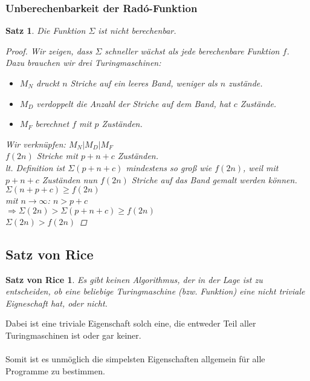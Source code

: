 \documentclass{article}
\begin{document}
\subsubsection{Unberechenbarkeit der Rad\'o-Funktion}
\begin{framed}
    \newtheorem*{rado}{Satz}
    \begin{rado}
        Die Funktion $\Sigma$ ist nicht berechenbar.

        \begin{proof}
            Wir zeigen, dass $\Sigma$ schneller wächst als jede berechenbare Funktion $f$.\\
            Dazu brauchen wir drei Turingmaschinen:
            \begin{itemize}
                \item $M_N$ druckt $n$ Striche auf ein leeres Band, weniger als $n$ zustände.
                \item $M_D$ verdoppelt die Anzahl der Striche auf dem Band, hat $c$ Zustände.
                \item $M_F$ berechnet $f$ mit $p$ Zuständen.
            \end{itemize}
            Wir verknüpfen: $M_N | M_D | M_F$ \\
            \Rightarrow $f(2n)$ Striche mit $p+n+c$ Zuständen.\\
            lt. Definition ist $\Sigma(p+n+c)$ mindestens so groß wie $f(2n)$, weil mit $p+n+c$ Zuständen nun $f(2n)$ Striche auf das Band gemalt werden können.\\
            \Rightarrow $\Sigma(n+p+c) \geq f(2n)$\\
            mit $n\rightarrow\infty$: $n>p+c$\\$\Rightarrow\Sigma(2n) > \Sigma(p+n+c)\geq f(2n)$\\
                \Rightarrow $\Sigma(2n)>f(2n)$\qedhere
        \end{proof}
    \end{rado}
\end{framed}
\subsection{Satz von Rice}
\newtheorem*{rice}{Satz von Rice}
\begin{framed}
    \begin{rice}
        Es gibt keinen Algorithmus, der in der Lage ist zu entscheiden, ob eine beliebige Turingmaschine (bzw. Funktion) eine nicht triviale Eigneschaft hat, oder nicht. 
    \end{rice} 
\end{framed}
Dabei ist eine triviale Eigenschaft solch eine, die entweder Teil aller Turingmaschinen ist oder gar keiner.\\
\\
Somit ist es unmöglich die simpelsten Eigenschaften allgemein für alle Programme zu bestimmen.
\end{document}
